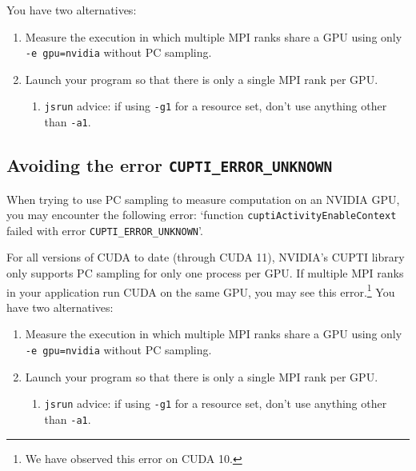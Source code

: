 \documentclass[11pt,twoside,letterpaper]{report}
\begin{document}
You have two alternatives: 
\begin{enumerate}
\item Measure the execution in which multiple MPI ranks share a GPU using only {\tt -e gpu=nvidia} without PC sampling.
\item Launch your program so that there is only a single MPI rank per GPU.
\begin{enumerate}
\item {\tt jsrun} advice: if using {\tt -g1} for a resource set, don't use anything other than {\tt -a1}.
\end{enumerate}
\end{enumerate}


\subsection{Avoiding the error {\tt CUPTI\_ERROR\_UNKNOWN}}

When trying to use PC sampling to measure computation on an NVIDIA GPU, you may encounter the following error: `function {\tt cuptiActivityEnableContext} failed with error {\tt CUPTI\_ERROR\_UNKNOWN}'.

For all versions of CUDA  to date (through CUDA 11), NVIDIA's CUPTI library only supports PC sampling for only one process per GPU. If multiple MPI ranks in your application run CUDA on the same GPU, you may see this error.\footnote{We have observed this error on CUDA 10.} You have two alternatives: 
\begin{enumerate}
\item Measure the execution in which multiple MPI ranks share a GPU using only {\tt -e gpu=nvidia} without PC sampling.
\item Launch your program so that there is only a single MPI rank per GPU.
\begin{enumerate}
\item {\tt jsrun} advice: if using {\tt -g1} for a resource set, don't use anything other than {\tt -a1}.
\end{enumerate}
\end{enumerate}


\end{document}
